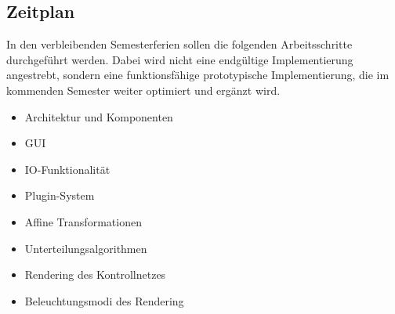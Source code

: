 \subsection{Zeitplan}

In den verbleibenden Semesterferien sollen die folgenden Arbeitsschritte durchgeführt werden.
Dabei wird nicht eine endgültige Implementierung angestrebt, sondern eine funktionsfähige prototypische Implementierung, die im kommenden Semester weiter optimiert und ergänzt wird.

\begin{itemize}
\item Architektur und Komponenten
\item GUI
\item IO-Funktionalität
\item Plugin-System
\item Affine Transformationen
\item Unterteilungsalgorithmen
\item Rendering des Kontrollnetzes
\item Beleuchtungsmodi des Rendering
\end{itemize}


